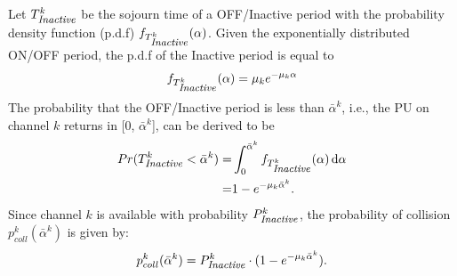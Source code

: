 \documentclass[journal]{IEEEtran} \ifCLASSINFOpdf
\newcommand{\ud}{\,\mathrm{d}}
\begin{document}
Let $T_{\mbox{\footnotesize \textit{Inactive}}}^k$ be the sojourn time of a OFF/Inactive period with the probability density function (p.d.f) $f_{T_{\mbox{\footnotesize \textit{Inactive}}}^k}(\alpha)$. Given the exponentially distributed ON/OFF period, the p.d.f of the Inactive period is equal to \cite{Kim2008}
\begin{equation} \notag
f_{T_{\mbox{\footnotesize \textit{Inactive}}}^k}(\alpha) = \mu_k e^{-\mu_k \alpha}
\end{equation}
The probability that the OFF/Inactive period is less than $\bar{\alpha}^k$, i.e., the PU on channel $k$ returns in [0, $\bar{\alpha}^k$], can be derived to be
\begin{equation} \notag
\begin{split}
Pr(T_{\mbox{\footnotesize \textit{Inactive}}}^k < \bar{\alpha}^k) =& \int_0^{\bar{\alpha}^k} f_{T_{\mbox{\footnotesize \textit{Inactive}}}^k}(\alpha) \ud \alpha \\
=& 1 - e^{-\mu_k \bar{\alpha}^k}.
\end{split}
\end{equation}
Since channel $k$ is available with probability $P_{\mbox{\footnotesize \textit{Inactive}}}^k$, the probability of collision $p_{coll}^k(\bar{\alpha}^{k})$ is given by:
\begin{equation} \notag
p_{coll}^k(\bar{\alpha}^{k}) = P_{\mbox{\footnotesize \textit{Inactive}}}^k \cdot (1-e^{-\mu_k \bar{\alpha}^{k}}).
\end{equation}
\end{document}
